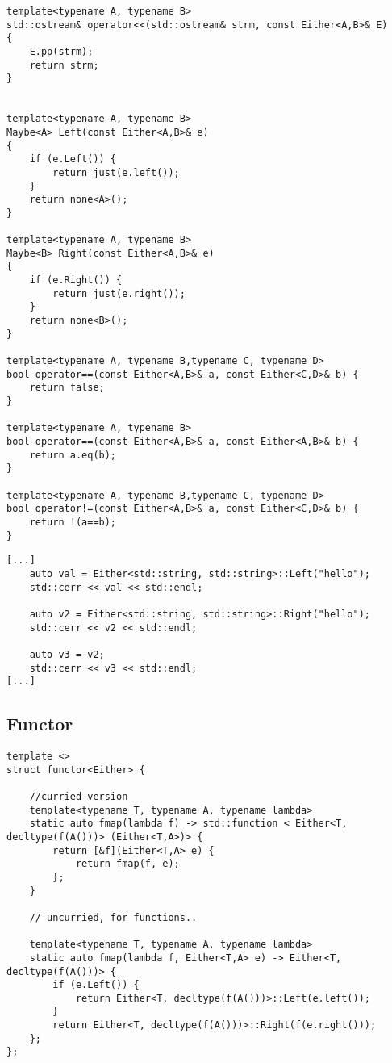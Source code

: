 \documentclass[12pt,fleqn]{article}
\begin{document}
%
%
%
\begin{minipage}{\linewidth}
\begin{lstlisting}[caption=Auxilliary functions for the Either type class, label=eitheraux]
template<typename A, typename B>
std::ostream& operator<<(std::ostream& strm, const Either<A,B>& E) 
{
	E.pp(strm);
	return strm;
}


template<typename A, typename B>
Maybe<A> Left(const Either<A,B>& e)
{
	if (e.Left()) {
		return just(e.left());
	}
	return none<A>();
}

template<typename A, typename B>
Maybe<B> Right(const Either<A,B>& e)
{
	if (e.Right()) {
		return just(e.right());
	}
	return none<B>();
}

template<typename A, typename B,typename C, typename D>
bool operator==(const Either<A,B>& a, const Either<C,D>& b) {
	return false;
}

template<typename A, typename B> 
bool operator==(const Either<A,B>& a, const Either<A,B>& b) {
	return a.eq(b);
}

template<typename A, typename B,typename C, typename D>
bool operator!=(const Either<A,B>& a, const Either<C,D>& b) {
	return !(a==b);
}

\end{lstlisting}
\end{minipage}
%
%
%
%


%
%
\begin{minipage}{\linewidth}
\begin{lstlisting}[caption=Example of the use of Either,label=eitherexamp]
[...]	
	auto val = Either<std::string, std::string>::Left("hello");
	std::cerr << val << std::endl;

	auto v2 = Either<std::string, std::string>::Right("hello");
	std::cerr << v2 << std::endl;

	auto v3 = v2;
	std::cerr << v3 << std::endl;
[...]
\end{lstlisting}
\end{minipage}
%
%
%


\subsection{Functor}
%


%
%
\begin{minipage}{\linewidth}
\begin{lstlisting}[caption=Either Functor,label=eitherfunctor]
template <>
struct functor<Either> {

	//curried version
	template<typename T, typename A, typename lambda>
	static auto fmap(lambda f) -> std::function < Either<T, decltype(f(A()))> (Either<T,A>)> {
		return [&f](Either<T,A> e) {
			return fmap(f, e);
		};
	}
	
	// uncurried, for functions..
	
	template<typename T, typename A, typename lambda>
	static auto fmap(lambda f, Either<T,A> e) -> Either<T, decltype(f(A()))> {
		if (e.Left()) {
			return Either<T, decltype(f(A()))>::Left(e.left());
		} 
		return Either<T, decltype(f(A()))>::Right(f(e.right()));
	};
};
\end{lstlisting}
\end{minipage}
%
%
%
\end{document}
